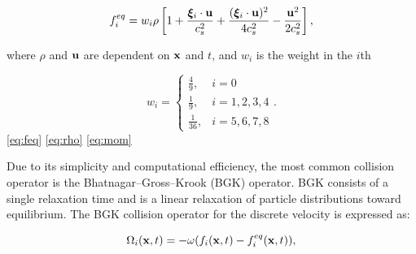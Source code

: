 \begin{equation} \label{eq:feq}
  f_i^{eq} = w_i \rho \left[1 + \frac{\boldsymbol{\xi}_i \cdot \mathbf{u}}{c_s^2} + \frac{(\boldsymbol{\xi}_i \cdot \mathbf{u})^2}{4c_s^2} - \frac{\mathbf{u}^2}{2c_s^2} \right],
\end{equation}

\noindent where $\rho$ and $\mathbf{u}$ are dependent on $\mathbf{x}$ and $t$, and $w_i$ is the weight in the $i$th \DIFdelbegin \DIFdel{:%
}\DIFdelend \DIFaddbegin {}\DIFaddend 

\begin{equation} \label{eq:weights}
w_i = \begin{cases}
    \frac{4}{9}, & i = 0 \\
    \frac{1}{9}, & i = 1, 2, 3, 4 \\
    \frac{1}{36}, & i = 5, 6, 7, 8
\end{cases}.
\end{equation}
\DIFaddbegin \noindent {}\eqref{eq:feq} \eqref{eq:rho} \eqref{eq:mom} \DIFaddend 

Due to its simplicity and computational efficiency, the most common collision operator is the Bhatnagar--Gross--Krook (BGK) operator.
BGK consists of a single relaxation time and is a linear relaxation of particle distributions toward equilibrium.
The BGK collision operator for the \DIFdelbegin {}\DIFdelend \DIFaddbegin {}\DIFaddend discrete velocity is expressed as:

\begin{equation} \label{eq:bgk}
\Omega_i(\mathbf{x}, t) = -\omega (f_i(\mathbf{x}, t) - f_i^{eq}(\mathbf{x}, t)),
\end{equation}

